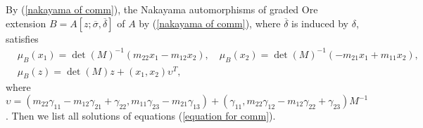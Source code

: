 \documentclass[a4paper,10pt]{amsart}
\theoremstyle{definition}
\numberwithin{equation}{section}
\begin{document}
By (\ref{nakayama of comm}), the Nakayama automorphisms of graded Ore extension $B=A[z;\overline{\sigma},\overline{\delta}]$ of $A$ by (\ref{nakayama of comm}), where $\overline{\delta}$ is induced by $\delta$, satisfies
\begin{equation}\label{naka equa for comm}
\begin{aligned}
&\mu_B(x_1)=\det(M)^{-1}(m_{22}x_1-m_{12}x_2),\quad \mu_B(x_2)=\det(M)^{-1}(-m_{21}x_1+m_{11}x_2),\\ &\mu_B(z)=\det(M)z+(x_1,x_2)\upsilon^T,
    \end{aligned}
\end{equation}
where $\upsilon=\left(m_{22}\gamma_{11}-m_{12}\gamma_{21}+\gamma_{22},m_{11}\gamma_{23}-m_{21}\gamma_{13}\right)
+\left(\gamma_{11},m_{22}\gamma_{12}-m_{12}\gamma_{22}+\gamma_{23}\right)M^{-1}$. Then we list all solutions of equations (\ref{equation for comm}).
\end{document}

